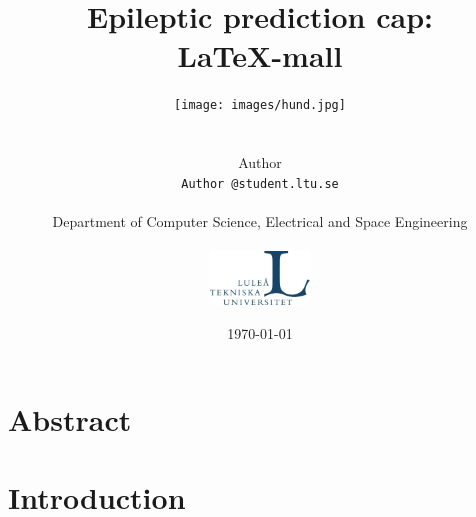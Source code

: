 \documentclass{article}
\title{Epileptic prediction cap:\\
\LaTeX -mall}
\author{\texttt{[image: images/hund.jpg]} \\ \\ \\
Author \\
{\tt Author @student.ltu.se} \\
\\Department of Computer Science, Electrical and Space Engineering \\ \\
\includegraphics[width=0.2\textwidth]{images/ltu_swe.jpg}}
\date{\today}
\begin{document}
\maketitle
\thispagestyle{empty}%
\setcounter{page}{0} %
\newpage






\section*{Abstract}

 
\newpage

\tableofcontents
\newpage

%
%



\newpage
\setcounter{page}{1} %
\section{Introduction}

\end{document}

